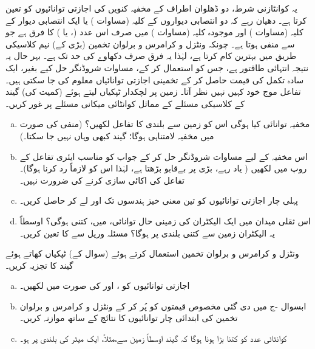  یہ کوانٹازنی شرط، دو ڈھلوان اطراف کے  مخفیہ کنویں کی اجازتی توانائیوں کو تعین کرتا ہے۔ دھیان رہے کہ دو انتصابی دیواروں کے کلیہ (مساوات ) یا ایک انتصابی دیوار کے کلیہ (مساوات ) اور موجودہ کلیہ (مساوات ) میں صرف اس عدد (،  یا ) کا فرق ہے جو  سے منفی ہوتا ہے۔ چونکہ ونٹزل و کرامرس و برلوان تخمین (بڑی  کے) نیم کلاسیکی طریق میں بہترین کام کرتا ہے، لہٰذا یہ فرق صرف دکھاوے کی حد تک ہے۔ بہر حال یہ نتیجہ انتہائی طاقتور ہے، جس کو استعمال کر کے، مساوات شروڈنگر حل کیے بغیر، ایک سادہ تکمل کی قیمت حاصل کر کے تخمینی اجازتی توانائیاں معلوم کی جا سکتی ہیں۔ تفاعل موج خود کہیں نہیں نظر آتا۔
زمین پر لچکدار ٹپکیاں لیتے ہوئے (کمیت  کی) گیند کے کلاسیکی مسئلے کے مماثل کوانٹائی میکانی مسئلے پر غور کریں۔
\begin{enumerate}[a.]
\item
 مخفیہ توانائی کیا ہوگی اس کو زمین سے بلندی  کا تفاعل لکھیں؟ (منفی  کی صورت میں مخفیہ لامتناہی ہوگا؛ گیند کبھی وہاں نہیں جا سکتا۔)
\item
 اس مخفیہ کے لیے مساوات شروڈنگر حل کر کے جواب کو مناسب ایئری تفاعل کے روپ میں لکھیں ( یاد رہے، بڑی  پر  بےقابو بڑھتا ہے، لہٰذا اس کو لازماً رد کرنا ہوگا)۔ تفاعل  کی اکائی سازی کرنے کی ضرورت نہیں۔
\item
 پہلی چار اجازتی توانائیوں کو تین معنی خیز ہندسوں تک  اور  لے کر حاصل کریں۔
\item
 اس ثقلی میدان میں ایک الیکٹران کی زمینی حال توانائی،  میں، کتنی ہوگی؟ اوسطاً یہ الیکٹران زمین سے کتنی بلندی پر ہوگا؟  مسئلہ وریل سے  کا تعین کریں۔
 \end{enumerate}
 ونٹزل و کرامرس و برلوان تخمین استعمال کرتے ہوئے (سوال  کے) ٹپکیاں کھاتے ہوئے گیند کا تجزیہ کریں۔
\begin{enumerate}[a.]
\item
 اجازتی توانائیوں  کو ،  اور  کی صورت میں لکھیں۔
\item
 ابسوال -ج میں دی گئی مخصوص قیمتوں کو پُر کر کے ونٹزل و کرامرس و برلوان تخمین کی ابتدائی چار توانائیوں کا  نتائج کے ساتھ موازنہ کریں۔
\item
کوانٹائی عدد  کو کتنا بڑا ہونا ہوگا کہ گیند اوسطاً زمین سے،مثلاً، ایک میٹر کی بلندی پر ہو۔
\end{enumerate}
